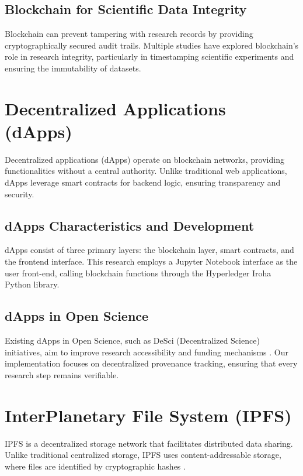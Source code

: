 \documentclass{article}
\begin{document}
\subsection{Blockchain for Scientific Data Integrity}
Blockchain can prevent tampering with research records by providing cryptographically secured audit trails. Multiple studies \cite{chen2018blockchain, zhang2020scientific} have explored blockchain's role in research integrity, particularly in timestamping scientific experiments and ensuring the immutability of datasets.

\section{Decentralized Applications (dApps)}

Decentralized applications (dApps) operate on blockchain networks, providing functionalities without a central authority. Unlike traditional web applications, dApps leverage smart contracts for backend logic, ensuring transparency and security.

\subsection{dApps Characteristics and Development}
dApps consist of three primary layers: the blockchain layer, smart contracts, and the frontend interface. This research employs a Jupyter Notebook interface as the user front-end, calling blockchain functions through the Hyperledger Iroha Python library.

\subsection{dApps in Open Science}
Existing dApps in Open Science, such as DeSci (Decentralized Science) initiatives, aim to improve research accessibility and funding mechanisms \cite{tennant2021decentralized}. Our implementation focuses on decentralized provenance tracking, ensuring that every research step remains verifiable.

\section{InterPlanetary File System (IPFS)}

IPFS is a decentralized storage network that facilitates distributed data sharing. Unlike traditional centralized storage, IPFS uses content-addressable storage, where files are identified by cryptographic hashes \cite{benet2014ipfs}.
\end{document}
